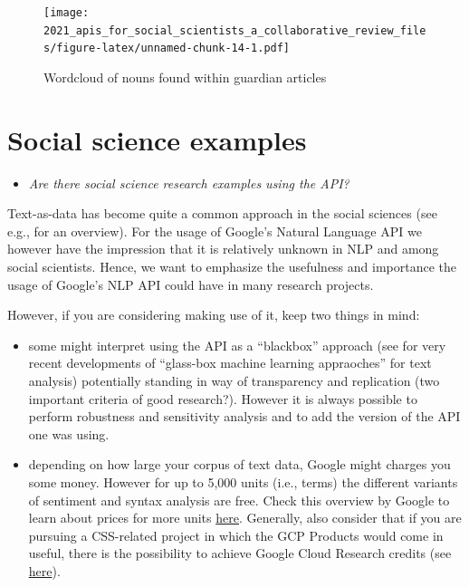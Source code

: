 \documentclass[
]{book}
\providecommand{\tightlist}{%
  \setlength{\itemsep}{0pt}\setlength{\parskip}{0pt}}
\begin{document}
\begin{figure}
\centering
\texttt{[image: 2021\_apis\_for\_social\_scientists\_a\_collaborative\_review\_files/figure-latex/unnamed-chunk-14-1.pdf]}
\caption{\label{fig:unnamed-chunk-14}Wordcloud of nouns found within guardian articles}
\end{figure}

\hypertarget{social-science-examples}{%
\section{Social science examples}\label{social-science-examples}}

\begin{itemize}
\tightlist
\item
  \emph{Are there social science research examples using the API?}
\end{itemize}

Text-as-data has become quite a common approach in the social sciences (see e.g., \citet{Grimmer2013-xe} for an overview). For the usage of Google's Natural Language API we however have the impression that it is relatively unknown in NLP and among social scientists. Hence, we want to emphasize the usefulness and importance the usage of Google's NLP API could have in many research projects.

However, if you are considering making use of it, keep two things in mind:

\begin{itemize}
\item
  some might interpret using the API as a ``blackbox'' approach (see \citet{Dobbrick2021-iz} for very recent developments of ``glass-box machine learning appraoches'' for text analysis) potentially standing in way of transparency and replication (two important criteria of good research?). However it is always possible to perform robustness and sensitivity analysis and to add the version of the API one was using.
\item
  depending on how large your corpus of text data, Google might charges you some money. However for up to 5,000 units (i.e., terms) the different variants of sentiment and syntax analysis are free. Check this overview by Google to learn about prices for more units \href{\%22https://cloud.google.com/natural-language/pricing\%22}{here}. Generally, also consider that if you are pursuing a CSS-related project in which the GCP Products would come in useful, there is the possibility to achieve Google Cloud Research credits (see \href{\%22https://edu.google.com/programs/credits/research/?modal_active=none\%22}{here}).
\end{itemize}
\end{document}
